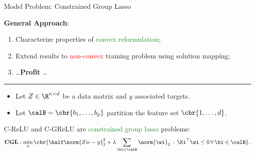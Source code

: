 \documentclass[usenames,dvipsnames,mathserif,notheorems]{beamer}
\newcommand{\horizontalrule}{
	{
			\vspace{-0.5em}
			\center \rule{\textwidth}{0.1em}
			\vspace{-0.2em}
		}
}
\newcommand{\red}[1]{\textcolor{Red}{#1}}
\newcommand{\green}[1]{\textcolor{ForestGreen}{#1}}
\begin{document}
\begin{frame}{Model Problem: Constrained Group Lasso}

	{
		\large
		\textbf{General Approach}:
		\begin{enumerate}
			\large
			\item \pause
			      Characterize properties of \green{convex reformulation};
			      \vspace{1ex}
			\item \pause
			      Extend results to \red{non-convex} training problem
			      using solution mapping;
			      \pause
			\item \ldots \textbf{Profit} \ldots
		\end{enumerate}
	}

	\pause
	\horizontalrule

	\begin{itemize}
		\item Let \( Z \in \R^{n \times d} \) be a data matrix and \( y \) associated targets.
		      \pause
		\item Let \( \calB = \cbr{b_1, \ldots, b_p} \) partition the
		      feature set \( \cbr{1, \ldots, d} \).
		      \pause
	\end{itemize}

	\vspace{2ex}

	C-ReLU and C-GReLU are \green{constrained group lasso} problems:
	\vspace{-1ex}
	\begin{equation*}
		\textbf{CGL}: \min_{w}
		\cbr{ \half \norm{Z w - y}_2^2
			+ \lambda \sum_{\bi \in \calB} \norm{\wi}_2
			\, : \, \Ki^\top \wi \leq 0 \, \forall \, \bi \in \calB}.
	\end{equation*}

\end{frame}
\end{document}
